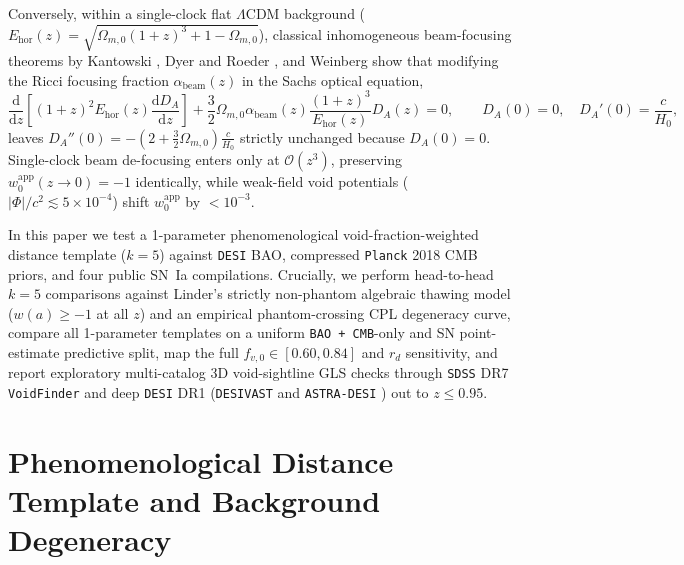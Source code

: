 \documentclass[11pt,a4paper]{article}
\begin{document}
Conversely, within a single-clock flat $\Lambda$CDM background ($E_{\mathrm{hor}}(z) = \sqrt{\Omega_{m,0}(1+z)^3 + 1 - \Omega_{m,0}}$), classical inhomogeneous beam-focusing theorems by Kantowski \cite{Kantowski1969}, Dyer and Roeder \cite{DyerRoeder1973}, and Weinberg \cite{Weinberg1976} show that modifying the Ricci focusing fraction $\alpha_{\mathrm{beam}}(z)$ in the Sachs optical equation,
\begin{equation}
    \frac{\mathrm{d}}{\mathrm{d}z}\!\left[(1+z)^2 E_{\mathrm{hor}}(z)\frac{\mathrm{d}D_A}{\mathrm{d}z}\right] + \frac{3}{2}\Omega_{m,0}\alpha_{\mathrm{beam}}(z)\frac{(1+z)^3}{E_{\mathrm{hor}}(z)}D_A(z) = 0, \qquad D_A(0) = 0,\quad D_A'(0) = \frac{c}{H_0},
    \label{eq:dyer-roeder}
\end{equation}
leaves $D_A''(0) = -(2 + \frac{3}{2}\Omega_{m,0})\frac{c}{H_0}$ strictly unchanged because $D_A(0) = 0$. Single-clock beam de-focusing enters only at $\mathcal{O}(z^3)$, preserving $w_0^{\mathrm{app}}(z \to 0) = -1$ identically, while weak-field void potentials ($|\Phi|/c^2 \lesssim 5\times 10^{-4}$) shift $w_0^{\mathrm{app}}$ by $< 10^{-3}$.

In this paper we test a 1-parameter phenomenological void-fraction-weighted distance template ($k = 5$) against \texttt{DESI} BAO, compressed \texttt{Planck} 2018 CMB priors, and four public SN~Ia compilations. Crucially, we perform head-to-head $k = 5$ comparisons against Linder's strictly non-phantom algebraic thawing model ($w(a) \ge -1$ at all $z$) and an empirical phantom-crossing CPL degeneracy curve, compare all 1-parameter templates on a uniform \texttt{BAO + CMB}-only and SN point-estimate predictive split, map the full $f_{v,0} \in [0.60, 0.84]$ and $r_d$ sensitivity, and report exploratory multi-catalog 3D void-sightline GLS checks through \texttt{SDSS} DR7 \texttt{VoidFinder} \cite{Douglass2023ApJS} and deep \texttt{DESI} DR1 (\texttt{DESIVAST} \cite{DESIVAST2025} and \texttt{ASTRA-DESI} \cite{ASTRADESI2025}) out to $z \le 0.95$.

\section{Phenomenological Distance Template and Background Degeneracy}
\end{document}
